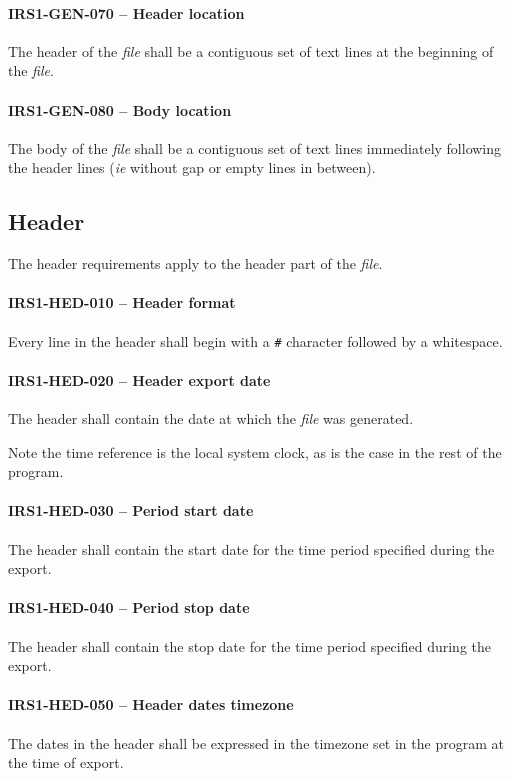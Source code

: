 \paragraph{IRS1-GEN-070 -- Header location}
The header of the \emph{file} shall be a contiguous set of text lines
at the beginning of the \emph{file}.

\paragraph{IRS1-GEN-080 -- Body location}
The body of the \emph{file} shall be a contiguous set of text lines
immediately following the header lines (\textit{ie} without gap or empty lines
in between).

\subsection{Header}
The header requirements apply to the header part of the \emph{file}.

\paragraph{IRS1-HED-010 -- Header format}
Every line in the header shall begin with a \lstinline{#} character
followed by a whitespace.

\paragraph{IRS1-HED-020 -- Header export date}
The header shall contain the date at which the \emph{file} was generated.

Note the time reference is the local system clock, as is the case in the
rest of the program.

\paragraph{IRS1-HED-030 -- Period start date}
The header shall contain the start date for the time period specified
during the export.

\paragraph{IRS1-HED-040 -- Period stop date}
The header shall contain the stop date for the time period specified
during the export.

\paragraph{IRS1-HED-050 -- Header dates timezone}
The dates in the header shall be expressed in the timezone set
in the program at the time of export.

